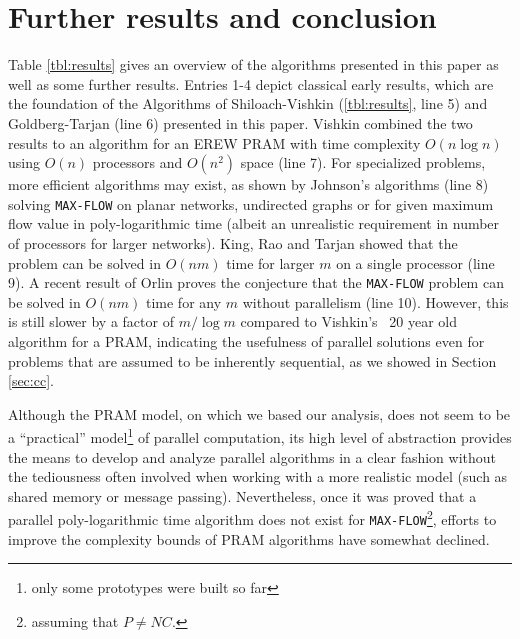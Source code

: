\documentclass[a4paper,10pt, twocolumn]{article}
\begin{document}
\section{Further results and conclusion}
\label{sec:further}
Table \ref{tbl:results} gives an overview of the algorithms presented in this paper as well as some further results. Entries 1-4 depict classical early results, which are the foundation of the Algorithms of Shiloach-Vishkin (\ref{tbl:results}, line 5) and Goldberg-Tarjan (line 6) presented in this paper.  Vishkin combined the two results to an algorithm for an EREW PRAM with time complexity $O(n \log n)$ using $O(n)$ processors and $O(n^{2})$ space (line 7). For specialized problems, more efficient algorithms may exist, as shown by Johnson's algorithms (line 8) solving \lstinline|MAX-FLOW| on planar networks, undirected graphs or for  given maximum flow value in poly-logarithmic time (albeit an unrealistic requirement in number of processors for larger networks). King, Rao and Tarjan showed that the problem can be solved in $O(nm)$ time for larger $m$ on a single processor (line 9). A recent result of Orlin proves the conjecture that the \lstinline|MAX-FLOW| problem can be solved in $O(nm)$ time for any $m$ without parallelism (line 10). However, this is still slower by a factor of $m/ \log m$ compared to Vishkin's~\cite{vishkin92} 20 year old algorithm for a PRAM, indicating the usefulness of parallel solutions even for problems that are assumed to be inherently sequential, as we showed in Section \ref{sec:cc}.

Although the PRAM model, on which we based our analysis, does not seem to be a ``practical'' model\footnote{only some prototypes were built so far} of parallel computation, its high level of abstraction provides the means to develop and analyze parallel algorithms in a clear fashion without the tediousness often involved when working with a more realistic model (such as shared memory or message passing). Nevertheless, once it was proved that a parallel poly-logarithmic time algorithm does not exist for \lstinline|MAX-FLOW|\footnote{assuming that $P \neq NC$.}, efforts to improve the complexity bounds of PRAM algorithms have somewhat declined.


\printbibliography
\end{document}
